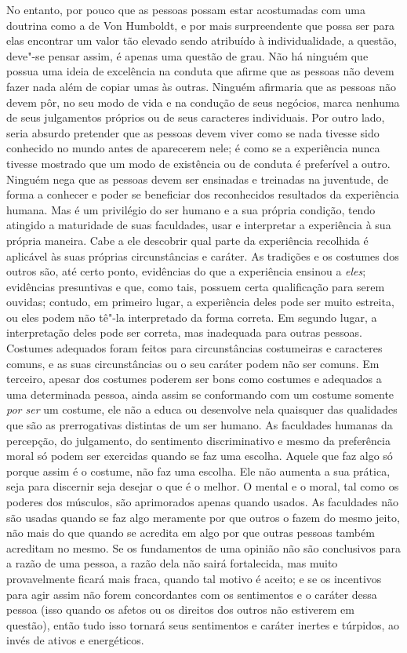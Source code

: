 No entanto, por pouco que as pessoas possam estar acostumadas com uma
doutrina como a de Von Humboldt, e por mais surpreendente que possa ser para
elas encontrar um valor tão elevado sendo atribuído à individualidade,
a questão, deve"-se pensar assim, é apenas uma questão de grau. Não há
ninguém que possua uma ideia de excelência na conduta que afirme que as
pessoas não devem fazer nada além de copiar umas às outras. Ninguém
afirmaria que as pessoas não devem pôr, no seu modo de vida e na
condução de seus negócios, marca nenhuma de seus julgamentos próprios
ou de seus caracteres individuais. Por outro lado, seria absurdo
pretender que as pessoas devem viver como se nada tivesse sido
conhecido no mundo antes de aparecerem nele; é como se a experiência
nunca tivesse mostrado que um modo de existência ou de conduta é
preferível a outro. Ninguém nega que as pessoas devem ser ensinadas e
treinadas na juventude, de forma a conhecer e poder se beneficiar dos reconhecidos
resultados da experiência humana. Mas é um privilégio do
ser humano e a sua própria condição, tendo atingido a maturidade
de suas faculdades, usar e interpretar a experiência à sua própria
maneira. Cabe a ele descobrir qual parte da experiência recolhida é
aplicável às suas próprias circunstâncias e caráter. As tradições e os
costumes dos outros são, até certo ponto, evidências do que a
experiência ensinou a \textit{eles}; evidências presuntivas e que, como tais,
possuem certa qualificação para serem ouvidas; contudo, em primeiro lugar,
a experiência deles pode ser muito estreita, ou eles podem não tê"-la
interpretado da forma correta. Em segundo lugar, a interpretação deles
pode ser correta, mas inadequada para outras pessoas. Costumes
adequados foram feitos para circunstâncias costumeiras e caracteres comuns, e as suas
circunstâncias ou o seu caráter podem não ser comuns. Em terceiro, apesar dos
costumes poderem ser bons como costumes e adequados a uma determinada
pessoa, ainda assim se conformando com um costume somente \textit{por ser} um
costume, ele não a educa ou desenvolve nela quaisquer das qualidades que são
as prerrogativas distintas de um ser humano. As faculdades humanas da
percepção, do julgamento, do sentimento discriminativo e mesmo da preferência
moral só podem ser exercidas quando se faz uma escolha. Aquele que faz
algo só porque assim é o costume, não faz uma escolha. Ele não aumenta a
sua prática, seja para discernir seja desejar o que é o melhor. O
mental e o moral, tal como os poderes dos músculos, são aprimorados
apenas quando usados. As faculdades não são usadas quando se faz
algo meramente por que outros o fazem do mesmo jeito, não mais do que
quando se acredita em algo por que outras pessoas também acreditam no
mesmo. Se os fundamentos de uma opinião não são conclusivos para a
razão de uma pessoa, a razão dela não sairá fortalecida, mas muito
provavelmente ficará mais fraca, quando tal motivo é aceito; e se os
incentivos para agir assim não forem concordantes com os sentimentos e o
caráter dessa pessoa (isso quando os afetos ou os direitos dos outros
não estiverem em questão), então tudo isso tornará seus
sentimentos e caráter inertes e túrpidos, ao invés de ativos e energéticos. 

